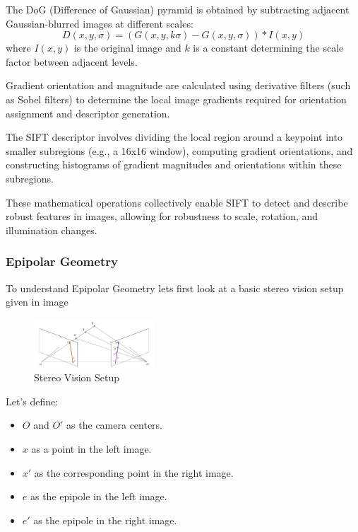 \documentclass[10pt,twocolumn,letterpaper]{article}
\begin{document}
The DoG (Difference of Gaussian) pyramid is obtained by subtracting adjacent Gaussian-blurred images at different scales:
\[ D(x, y, \sigma) = (G(x, y, k\sigma) - G(x, y, \sigma)) \ast I(x, y) \]
where $I(x, y)$ is the original image and $k$ is a constant determining the scale factor between adjacent levels.

Gradient orientation and magnitude are calculated using derivative filters (such as Sobel filters) to determine the local image gradients required for orientation assignment and descriptor generation.

The SIFT descriptor involves dividing the local region around a keypoint into smaller subregions (e.g., a 16x16 window), computing gradient orientations, and constructing histograms of gradient magnitudes and orientations within these subregions.

These mathematical operations collectively enable SIFT to detect and describe robust features in images, allowing for robustness to scale, rotation, and illumination changes.

\subsubsection{Epipolar Geometry}
To understand Epipolar Geometry lets first look at a basic stereo vision setup given in image
\begin{figure}[ht]
    \centering
    \includegraphics[width=0.4\textwidth]{epipolar.jpg}
    \caption{Stereo Vision Setup}
    \label{fig:stereo_vision_setup}
\end{figure}


Let's define:

\begin{itemize}
    \item \(O\) and \(O'\) as the camera centers.
    \item \(x\) as a point in the left image.
    \item \(x'\) as the corresponding point in the right image.
    \item \(e\) as the epipole in the left image.
    \item \(e'\) as the epipole in the right image.
\end{itemize}
\end{document}
